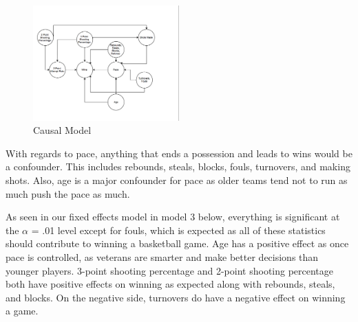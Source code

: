 \documentclass[12pt]{article}
\begin{document}
	\begin{figure}[h]
	\centering
	\caption{Causal Model}
\includegraphics[width=0.5\textwidth, scale = 2]{causal}
\end{figure}
        	With regards to pace, anything that ends a possession and leads to wins would be a confounder. This includes rebounds, steals, blocks, fouls, turnovers, and making shots. Also, age is a major confounder for pace as older teams tend not to run as much push the pace as much.\par
        	As seen in our fixed effects model in model 3 below, everything is significant at the $\alpha$ = .01 level except for fouls, which is expected as all of these statistics should contribute to winning a basketball game. Age has a positive effect as once pace is controlled, as veterans are smarter and make better decisions than younger players. 3-point shooting percentage and 2-point shooting percentage both have positive effects on winning as expected along with rebounds, steals, and blocks. On the negative side, turnovers do have
a negative effect on winning a game.\par
\end{document}
